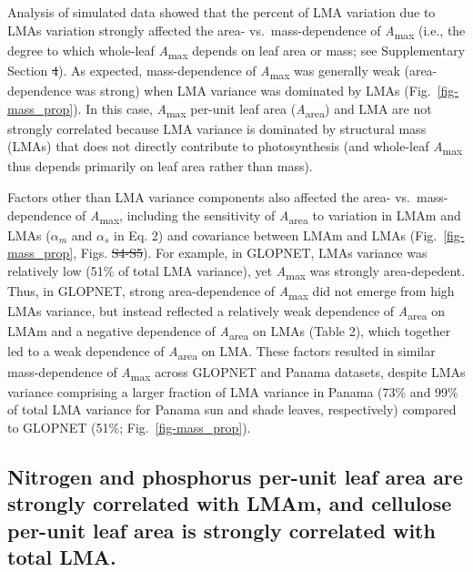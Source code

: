 \documentclass[
  12pt,
  letterpaper,
  DIV=11,
  numbers=noendperiod]{scrartcl}
\providecommand{\DIFadd}[1]{{\protect\color{blue}\uwave{#1}}} %
\providecommand{\DIFdel}[1]{{\protect\color{red}\sout{#1}}}                      %
\providecommand{\DIFaddbegin}{} %
\providecommand{\DIFaddend}{} %
\providecommand{\DIFdelbegin}{} %
\providecommand{\DIFdelend}{} %
\newcommand{\DIFscaledelfig}{0.5}
\newlength{\DIFdelgraphicswidth} %
\newlength{\DIFdelgraphicsheight} %
\newcommand{\DIFaddincludegraphics}[2][]{{\color{blue}\fbox{\DIFOincludegraphics[#1]{#2}}}} %
\newcommand{\DIFdelincludegraphics}[2][]{%
\sbox{\DIFdelgraphicsbox}{\DIFOincludegraphics[#1]{#2}}%
\settoboxwidth{\DIFdelgraphicswidth}{\DIFdelgraphicsbox} %
\settoboxtotalheight{\DIFdelgraphicsheight}{\DIFdelgraphicsbox} %
\scalebox{\DIFscaledelfig}{%
\parbox[b]{\DIFdelgraphicswidth}{\usebox{\DIFdelgraphicsbox}\\[-\baselineskip] \rule{\DIFdelgraphicswidth}{0em}}\llap{\resizebox{\DIFdelgraphicswidth}{\DIFdelgraphicsheight}{%
\setlength{\unitlength}{\DIFdelgraphicswidth}%
\begin{picture}(1,1)%
\thicklines\linethickness{2pt} %
{\color[rgb]{1,0,0}\put(0,0){\framebox(1,1){}}}%
{\color[rgb]{1,0,0}\put(0,0){\line( 1,1){1}}}%
{\color[rgb]{1,0,0}\put(0,1){\line(1,-1){1}}}%
\end{picture}%
}\hspace*{3pt}}} %
} %
\DeclareRobustCommand{\DIFaddbegin}{\DIFOaddbegin \let\includegraphics\DIFaddincludegraphics} %
\DeclareRobustCommand{\DIFaddend}{\DIFOaddend \let\includegraphics\DIFOincludegraphics} %
\DeclareRobustCommand{\DIFdelbegin}{\DIFOdelbegin \let\includegraphics\DIFdelincludegraphics} %
\DeclareRobustCommand{\DIFdelend}{\DIFOaddend \let\includegraphics\DIFOincludegraphics} %
\begin{document}
Analysis of simulated data showed that the percent of LMA variation due
to LMAs variation strongly affected the area- vs.~mass-dependence of
\emph{A}\textsubscript{max} (i.e., the degree to which whole-leaf
\emph{A}\textsubscript{max} depends on leaf area or mass; see
Supplementary Section \DIFdelbegin \DIFdel{4}\DIFdelend \DIFaddbegin \DIFadd{7}\DIFaddend ). As expected, mass-dependence of
\emph{A}\textsubscript{max} was generally weak (area-dependence was
strong) when LMA variance was dominated by LMAs
(Fig.~\ref{fig-mass_prop}). In this case, \emph{A}\textsubscript{max}
per-unit leaf area (\emph{A}\textsubscript{area}) and LMA are not
strongly correlated because LMA variance is dominated by structural mass
(LMAs) that does not directly contribute to photosynthesis (and
whole-leaf \emph{A}\textsubscript{max} thus depends primarily on leaf
area rather than mass).

Factors other than LMA variance components also affected the area-
vs.~mass-dependence of \emph{A}\textsubscript{max}, including the
sensitivity of \emph{A}\textsubscript{area} to variation in LMAm and
LMAs (\(\alpha_m\) and \(\alpha_s\) in Eq. 2) and covariance between
LMAm and LMAs (Fig.~\ref{fig-mass_prop}, Figs. \DIFdelbegin \DIFdel{S4-S5}\DIFdelend \DIFaddbegin \DIFadd{S5-S6}\DIFaddend ). For example, in
GLOPNET, LMAs variance was relatively low (51\% of total LMA variance),
yet \emph{A}\textsubscript{max} was strongly area-depedent. Thus, in
GLOPNET, strong area-dependence of \emph{A}\textsubscript{max} did not
emerge from high LMAs variance, but instead reflected a relatively weak
dependence of \emph{A}\textsubscript{area} on LMAm and a negative
dependence of \emph{A}\textsubscript{area} on LMAs (Table 2), which
together led to a weak dependence of \emph{A}\textsubscript{area} on
LMA. These factors resulted in similar mass-dependence of
\emph{A}\textsubscript{max} across GLOPNET and Panama datasets, despite
LMAs variance comprising a larger fraction of LMA variance in Panama
(73\% and 99\% of total LMA variance for Panama sun and shade leaves,
respectively) compared to GLOPNET (51\%; Fig.~\ref{fig-mass_prop}).

\subsection{Nitrogen and phosphorus per-unit leaf area are strongly
correlated with LMAm, and cellulose per-unit leaf area is strongly
correlated with total
LMA.}\label{nitrogen-and-phosphorus-per-unit-leaf-area-are-strongly-correlated-with-lmam-and-cellulose-per-unit-leaf-area-is-strongly-correlated-with-total-lma.}
\end{document}
